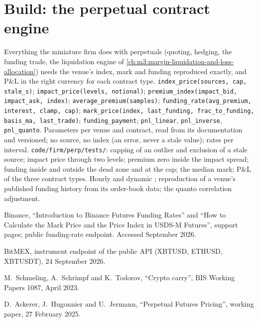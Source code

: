 \section{Build: the perpetual contract engine}\label{bld:m3:perpetual-futures:perp}

\begin{build}
 Everything the miniature firm does with perpetuals (quoting, hedging, the funding trade, the
liquidation engine of \cref{ch:m3:margin-liquidation-and-loss-allocation}) needs the venue's index, mark and funding
reproduced exactly, and P\&L in the right currency for each contract type.
 \texttt{index\_price(sources, cap, stale\_s)}; \texttt{impact\_price(levels, notional)};
\texttt{premium\_index(impact\_bid, impact\_ask, index)}; \texttt{average\_premium(samples)};
\texttt{funding\_rate(avg\_premium, interest, clamp, cap)}; \texttt{mark\_price(index, last\_funding,
frac\_to\_funding, basis\_ma, last\_trade)}; \texttt{funding\_payment}; \texttt{pnl\_linear}, \texttt{pnl\_inverse},
\texttt{pnl\_quanto}.
 Parameters per venue and contract, read from its documentation and versioned; no source, no index (an
error, never a stale value); rates per interval.
 \texttt{code/firm/perp/tests/}: capping of an outlier and exclusion of a stale source;
impact price through two levels; premium zero inside the impact spread; funding inside and outside the dead zone and at
the cap; the median mark; P\&L of the three contract types.
 Hourly and dynamic ; reproduction of a venue's published funding history from its
order-book data; the quanto correlation adjustment.
\end{build}

\begin{omsources}
\item Binance, ``Introduction to Binance Futures Funding Rates'' and ``How to Calculate the Mark Price and the Price
Index in USDS-M Futures'', support pages; public funding-rate endpoint. Accessed
September 2026.
\item BitMEX, instrument endpoint of the public API (XBTUSD, ETHUSD, XBTUSDT), 24 September 2026.
\item M.~Schmeling, A.~Schrimpf and K.~Todorov, ``Crypto carry'', BIS Working Papers 1087, April 2023.
\item D.~Ackerer, J.~Hugonnier and U.~Jermann, ``Perpetual Futures Pricing'', working paper, 27 February 2025.
\end{omsources}

